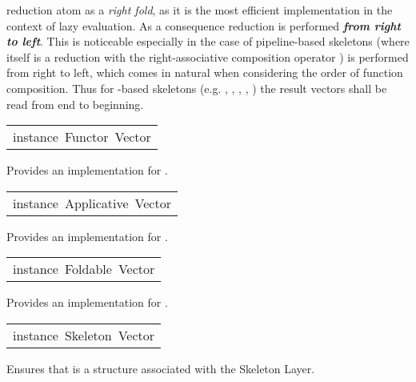 \begin{haddockdesc}
 reduction atom  as a \emph{right fold}, as it is the most efficient
 implementation in the context of lazy evaluation. As a consequence
 reduction is performed \textbf{\emph{from right to left}}. This is noticeable
 especially in the case of pipeline-based skeletons (where 
 itself is a reduction with the right-associative composition
 operator ) is performed from right to left, which
 comes in natural when considering the order of function
 composition. Thus for -based skeletons (e.g. ,
 , , , ) the result vectors shall be
 read from end to beginning.\par

\end{haddockdesc}
\begin{haddockdesc}
\item[\begin{tabular}{@{}l}
instance\ Functor\ Vector
\end{tabular}]\haddockbegindoc
Provides an implementation for .\par

\end{haddockdesc}
\begin{haddockdesc}
\item[\begin{tabular}{@{}l}
instance\ Applicative\ Vector
\end{tabular}]\haddockbegindoc
Provides an implementation for \haddockid{=*=}.\par

\end{haddockdesc}
\begin{haddockdesc}
\item[\begin{tabular}{@{}l}
instance\ Foldable\ Vector
\end{tabular}]\haddockbegindoc
Provides an implementation for .\par

\end{haddockdesc}
\begin{haddockdesc}
\item[\begin{tabular}{@{}l}
instance\ Skeleton\ Vector
\end{tabular}]\haddockbegindoc
Ensures that  is a structure associated with the Skeleton Layer.\par

\end{haddockdesc}
